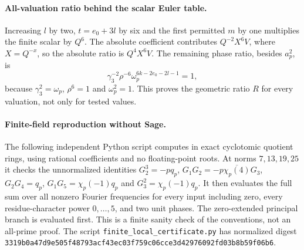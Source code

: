 \documentclass[12pt]{article}
\begin{document}
\paragraph{All-valuation ratio behind the scalar Euler table.}
Increasing \(l\) by two, \(t=e_0+3l\) by six and the first permitted
\(m\) by one multiplies the finite scalar by \(Q^6\).
The absolute coefficient contributes \(Q^{-2}X^6V\), where
\(X=Q^{-x}\), so the absolute ratio is \(Q^4X^6V\).
The remaining phase ratio, besides \(a_p^2\), is
\[
 \gamma_3^{-2}\rho^{-6}
 \omega_p^{6k-2e_0-2l-1}=1,
\]
because \(\gamma_3^2=\omega_p\), \(\rho^6=1\) and
\(\omega_p^2=1\).  This proves the geometric ratio \(R\) for every
valuation, not only for tested values.

\paragraph{Finite-field reproduction without Sage.}
The following independent Python script computes in exact cyclotomic
quotient rings, using rational coefficients and no floating-point roots.
At norms \(7,13,19,25\) it checks the unnormalized identities
\(G_2^3=-pq_p\), \(G_1G_2=-p\overline{\chi_p(4)}G_3\),
\(G_2G_4=q_p\), \(G_1G_5=\chi_p(-1)q_p\) and
\(G_3^2=\chi_p(-1)q_p\).
It then evaluates the full sum over all nonzero Fourier frequencies for
every input including zero, every residue-character power \(0,\ldots,5\),
and two unit phases.  The zero-extended principal branch is evaluated first.
This is a finite sanity check of the conventions, not an all-prime proof.
The script \texttt{finite\_local\_certificate.py} has normalized digest
\nolinkurl{3319b0a47d9e505f48793acf43ec03f759c06cce3d42976092fd03b8b59f06b6}.
\end{document}
